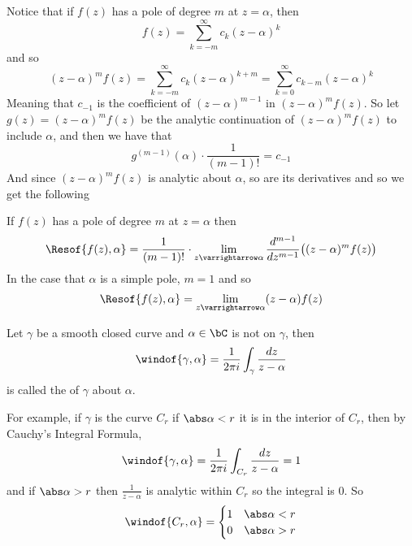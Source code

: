 \documentclass[10pt]{article}
\let\to=\varrightarrow
\begin{document}


\bigskip

Notice that if $f(z)$ has a pole of degree $m$ at $z=\alpha$, then
\[ f(z) = \sum_{k=-m}^\infty c_k (z-\alpha)^k \]
and so
\[ (z-\alpha)^mf(z) = \sum_{k=-m}^\infty c_k(z-\alpha)^{k+m} = \sum_{k=0}^\infty c_{k-m}(z-\alpha)^k \]
Meaning that $c_{-1}$ is the coefficient of $(z-\alpha)^{m-1}$ in $(z-\alpha)^mf(z)$.
So let $g(z)=(z-\alpha)^mf(z)$ be the analytic continuation of $(z-\alpha)^mf(z)$ to include $\alpha$, and then we have that
\[ g^{(m-1)}(\alpha)\cdot\frac1{(m-1)!} = c_{-1} \]
And since $(z-\alpha)^mf(z)$ is analytic about $\alpha$, so are its derivatives and so we get the following

\begin{prop*}

    If $f(z)$ has a pole of degree $m$ at $z=\alpha$ then
    \[ \Resof{f(z),\alpha} = \frac1{(m-1)!}\cdot\lim_{z\to\alpha}\frac{d^{m-1}}{dz^{m-1}}\bigl((z-\alpha)^mf(z)\bigr) \]
    In the case that $\alpha$ is a simple pole, $m=1$ and so
    \[ \Resof{f(z),\alpha} = \lim_{z\to\alpha}(z-\alpha)f(z) \]

\end{prop*}

\begin{defn*}

    Let $\gamma$ be a smooth closed curve and $\alpha\in\bC$ is not on $\gamma$, then
    \[ \windof{\gamma,\alpha} = \frac1{2\pi i}\int_\gamma\frac{dz}{z-\alpha} \]
    is called the  of $\gamma$ about $\alpha$.

\end{defn*}

For example, if $\gamma$ is the curve $C_r$ if $\abs\alpha<r$ it is in the interior of $C_r$, then by Cauchy's Integral Formula,
\[ \windof{\gamma,\alpha} = \frac1{2\pi i}\int_{C_r}\frac{dz}{z-\alpha} = 1 \]
and if $\abs\alpha>r$ then $\frac1{z-\alpha}$ is analytic within $C_r$ so the integral is $0$.
So
\[ \windof{C_r,\alpha} = \begin{cases} 1 & \abs\alpha<r \\ 0 & \abs\alpha>r \end{cases} \]
\end{document}
